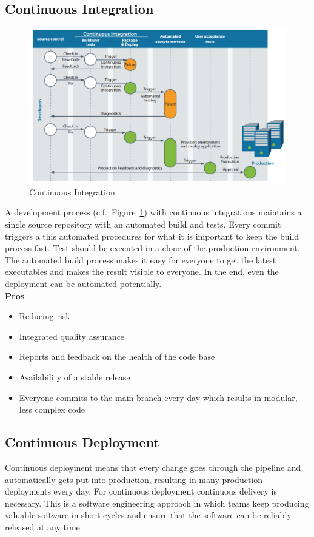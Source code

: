 \subsection{Continuous Integration}
\begin{figure}[h]
  \centering
  \includegraphics[width=.8\textwidth]{images/continuous_integration.png}
  \caption{Continuous Integration}\label{fig:continuous_integration}
\end{figure}
A development process (c.f.\ Figure~\ref{fig:continuous_integration}) with continuous integrations maintains a single source repository with an automated build and tests.
Every commit triggers a this automated procedures for what it is important to keep the build process fast.
Test should be executed in a clone of the production environment.
The automated build process makes it easy for everyone to get the latest executables and makes the result visible to everyone.
In the end, even the deployment can be automated potentially.\\

\textbf{Pros}
\begin{itemize}[topsep=0pt, noitemsep]
  \item Reducing risk
  \item Integrated quality assurance
  \item Reports and feedback on the health of the code base
  \item Availability of a stable release
  \item Everyone commits to the main branch every day which results in modular, less complex code
\end{itemize}

\subsection{Continuous Deployment}
Continuous deployment means that every change goes through the pipeline and automatically gets put into production, resulting in many production deployments every day.
For continuous deployment continuous delivery is necessary.
This is a software engineering approach in which teams keep producing valuable software in short cycles and ensure that the software can be reliably released at any time.\\

